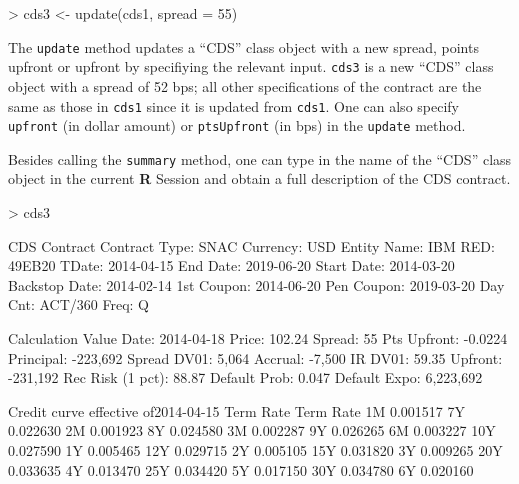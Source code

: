 \documentclass[a4paper]{article}
\begin{document}
\begin{Schunk}
\begin{Sinput}
> cds3 <- update(cds1, spread = 55)
\end{Sinput}
\end{Schunk}

The \texttt{update} method updates a ``CDS'' class object with a new
spread, points upfront or upfront by specifiying the relevant
input. \texttt{cds3} is a new ``CDS'' class object with a spread of 52
bps; all other specifications of the contract are the same as those in
\texttt{cds1} since it is updated from \texttt{cds1}. One can also
specify \texttt{upfront} (in dollar amount) or \texttt{ptsUpfront} (in
bps) in the \texttt{update} method.

Besides calling the \texttt{summary} method, one can type in the name
of the ``CDS'' class object in the current \textbf{R} Session and
obtain a full description of the CDS contract.

\begin{Schunk}
\begin{Sinput}
> cds3
\end{Sinput}
\begin{Soutput}
CDS Contract 
Contract Type:                      SNAC   Currency:                         USD
Entity Name:                         IBM   RED:                           49EB20
TDate:                        2014-04-15   End Date:                  2019-06-20
Start Date:                   2014-03-20   Backstop Date:             2014-02-14
1st Coupon:                   2014-06-20   Pen Coupon:                2019-03-20
Day Cnt:                         ACT/360   Freq:                               Q

Calculation 
Value Date:                   2014-04-18   Price:                         102.24
Spread:                               55   Pts Upfront:                  -0.0224
Principal:                      -223,692   Spread DV01:                    5,064
Accrual:                          -7,500   IR DV01:                        59.35
Upfront:                        -231,192   Rec Risk (1 pct):               88.87
Default Prob:                      0.047   Default Expo:               6,223,692

Credit curve effective of2014-04-15 
 Term     Rate Term     Rate
   1M 0.001517   7Y 0.022630
   2M 0.001923   8Y 0.024580
   3M 0.002287   9Y 0.026265
   6M 0.003227  10Y 0.027590
   1Y 0.005465  12Y 0.029715
   2Y 0.005105  15Y 0.031820
   3Y 0.009265  20Y 0.033635
   4Y 0.013470  25Y 0.034420
   5Y 0.017150  30Y 0.034780
   6Y 0.020160              
\end{Soutput}
\end{Schunk}
\end{document}
